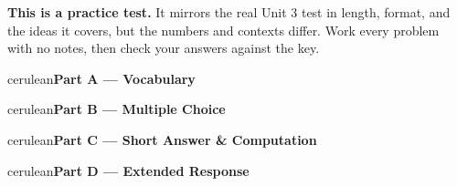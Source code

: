 \documentclass[10pt]{article}
\newcommand{\parthead}[1]{%
  \vspace{6pt}\noindent
  \begin{headlinebox}{cerulean}{\color{white}\bfseries #1}\end{headlinebox}%
  \vspace{4pt}}
\begin{document}
\namedateperiod

\vspace{0.10in}
\begin{remindbox}
\small
\textbf{This is a practice test.} It mirrors the real Unit 3 test in length, format,
and the ideas it covers, but the numbers and contexts differ. Work every problem
with no notes, then check your answers against the key.
\end{remindbox}

\parthead{Part A --- Vocabulary}

\parthead{Part B --- Multiple Choice}

\parthead{Part C --- Short Answer \& Computation}

\parthead{Part D --- Extended Response}
\end{document}

